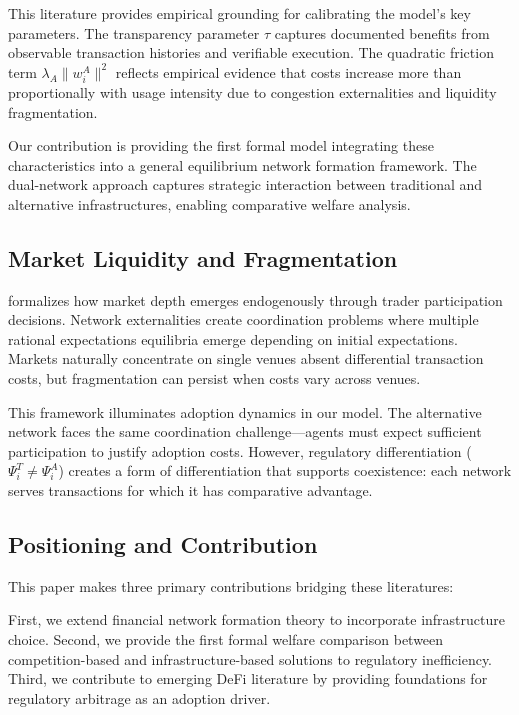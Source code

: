 \documentclass[12pt]{article}
\begin{document}
This literature provides empirical grounding for calibrating the model's key parameters. The transparency parameter $\tau$ captures documented benefits from observable transaction histories and verifiable execution. The quadratic friction term $\lambda_A \|w_i^A\|^2$ reflects empirical evidence that costs increase more than proportionally with usage intensity due to congestion externalities and liquidity fragmentation.

Our contribution is providing the first formal model integrating these characteristics into a general equilibrium network formation framework. The dual-network approach captures strategic interaction between traditional and alternative infrastructures, enabling comparative welfare analysis.

\subsection{Market Liquidity and Fragmentation}

\citet{pagano_trading_1989} formalizes how market depth emerges endogenously through trader participation decisions. Network externalities create coordination problems where multiple rational expectations equilibria emerge depending on initial expectations. Markets naturally concentrate on single venues absent differential transaction costs, but fragmentation can persist when costs vary across venues.

This framework illuminates adoption dynamics in our model. The alternative network faces the same coordination challenge—agents must expect sufficient participation to justify adoption costs. However, regulatory differentiation ($\Psi_i^T \neq \Psi_i^A$) creates a form of differentiation that supports coexistence: each network serves transactions for which it has comparative advantage.

\subsection{Positioning and Contribution}

This paper makes three primary contributions bridging these literatures:

First, we extend financial network formation theory to incorporate infrastructure choice. Second, we provide the first formal welfare comparison between competition-based and infrastructure-based solutions to regulatory inefficiency. Third, we contribute to emerging DeFi literature by providing foundations for regulatory arbitrage as an adoption driver. 
\end{document}
